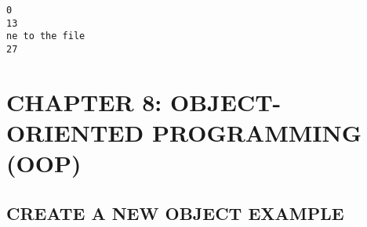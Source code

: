 \documentclass[11pt]{article}
\begin{document}
    \begin{Verbatim}[commandchars=\\\{\}]
0
13
ne to the file
27
    \end{Verbatim}

    \hypertarget{chapter-8-object-oriented-programming-oop}{%
\section{CHAPTER 8: OBJECT-ORIENTED PROGRAMMING
(OOP)}\label{chapter-8-object-oriented-programming-oop}}

    \hypertarget{create-a-new-object-example}{%
\subsection{CREATE A NEW OBJECT
EXAMPLE}\label{create-a-new-object-example}}
\end{document}
